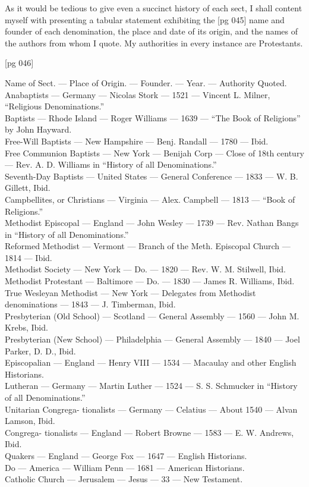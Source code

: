 As it would be tedious to give even a succinct
history of each sect, I shall content myself with
presenting a tabular statement exhibiting the
[pg 045]
name and founder of each denomination, the place
and date of its origin, and the names of the authors
from whom I quote. My authorities in every
instance are Protestants.

[pg 046]

Name of Sect. — Place of Origin. — Founder. — Year. — Authority Quoted. \\
Anabaptists — Germany — Nicolas Stork — 1521 — Vincent L. Milner, “Religious
Denominations.” \\
Baptists — Rhode Island — Roger Williams — 1639 — “The Book of Religions” by John Hayward. \\
Free-Will Baptists — New Hampshire — Benj. Randall — 1780 — Ibid. \\
Free Communion Baptists — New York — Benijah Corp — Close of 18th century — Rev. A. D. Williams in “History of all Denominations.” \\
Seventh-Day Baptists — United States — General Conference — 1833 — W. B. Gillett, Ibid. \\
Campbellites, or Christians — Virginia — Alex. Campbell — 1813 — “Book of Religions.” \\
Methodist Episcopal — England — John Wesley — 1739 — Rev. Nathan Bangs in “History of all Denominations.” \\
Reformed Methodist — Vermont — Branch of the Meth. Episcopal Church — 1814 — Ibid. \\
Methodist Society — New York — Do. — 1820 — Rev. W. M. Stilwell, Ibid. \\
Methodist Protestant — Baltimore — Do. — 1830 — James R. Williams, Ibid. \\
True Wesleyan Methodist — New York — Delegates from Methodist denominations — 1843 — J. Timberman, Ibid. \\
Presbyterian (Old School) — Scotland — General Assembly — 1560 — John M. Krebs, Ibid. \\
Presbyterian (New School) — Philadelphia — General Assembly — 1840 — Joel Parker, D. D., Ibid. \\
Episcopalian — England — Henry VIII — 1534 — Macaulay and other English Historians. \\
Lutheran — Germany — Martin Luther — 1524 — S. S. Schmucker in “History of all Denominations.” \\
Unitarian Congrega- tionalists — Germany — Celatius — About 1540 — Alvan Lamson, Ibid. \\
Congrega- tionalists — England — Robert Browne — 1583 — E. W. Andrews, Ibid. \\
Quakers — England — George Fox — 1647 — English Historians. \\
Do — America — William Penn — 1681 — American Historians. \\
Catholic Church — Jerusalem — Jesus — 33 — New Testament.

